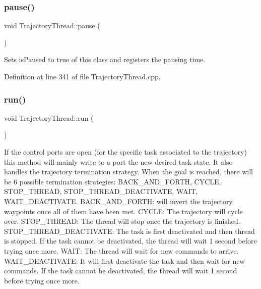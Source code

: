 \subsubsection{\texorpdfstring{pause()}{pause()}}
{\footnotesize\ttfamily void Trajectory\+Thread\+::pause (\begin{DoxyParamCaption}{ }\end{DoxyParamCaption})}

Sets is\+Paused to true of this class and registers the pausing time. 

Definition at line 341 of file Trajectory\+Thread.\+cpp.

\hypertarget{classocra__recipes_1_1TrajectoryThread_a835a13515f49bfa8ff047dbbaa6deb14}{}\label{classocra__recipes_1_1TrajectoryThread_a835a13515f49bfa8ff047dbbaa6deb14} 
\subsubsection{\texorpdfstring{run()}{run()}}
{\footnotesize\ttfamily void Trajectory\+Thread\+::run (\begin{DoxyParamCaption}{ }\end{DoxyParamCaption})\hspace{0.3cm}{\ttfamily [virtual]}}

If the control ports are open (for the specific task associated to the trajectory) this method will mainly write to a port the new desired task state. It also handles the trajectory termination strategy. When the goal is reached, there will be 6 possible termination strategies\+: B\+A\+C\+K\+\_\+\+A\+N\+D\+\_\+\+F\+O\+R\+TH, C\+Y\+C\+LE, S\+T\+O\+P\+\_\+\+T\+H\+R\+E\+AD, S\+T\+O\+P\+\_\+\+T\+H\+R\+E\+A\+D\+\_\+\+D\+E\+A\+C\+T\+I\+V\+A\+TE, W\+A\+IT, W\+A\+I\+T\+\_\+\+D\+E\+A\+C\+T\+I\+V\+A\+TE. B\+A\+C\+K\+\_\+\+A\+N\+D\+\_\+\+F\+O\+R\+TH\+: will invert the trajectory waypoints once all of them have been met. C\+Y\+C\+LE\+: The trajectory will cycle over. S\+T\+O\+P\+\_\+\+T\+H\+R\+E\+AD\+: The thread will stop once the trajectory is finished. S\+T\+O\+P\+\_\+\+T\+H\+R\+E\+A\+D\+\_\+\+D\+E\+A\+C\+T\+I\+V\+A\+TE\+: The task is first deactivated and then thread is stopped. If the task cannot be deactivated, the thread will wait 1 second before trying once more. W\+A\+IT\+: The thread will wait for new commands to arrive. W\+A\+I\+T\+\_\+\+D\+E\+A\+C\+T\+I\+V\+A\+TE\+: It will first deactivate the task and then wait for new commands. If the task cannot be deactivated, the thread will wait 1 second before trying once more. 


